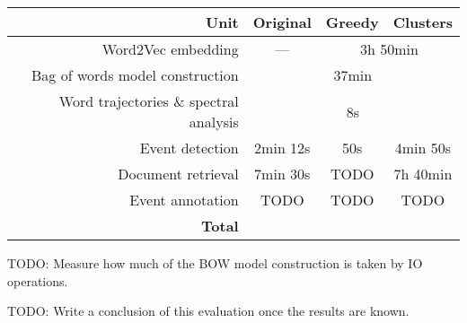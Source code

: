 \hspace{\fill}

\begin{minipage}{\linewidth}
\centering
\begin{tabular}{ r c c c }\toprule[1.5pt]
\bf Unit & \bf Original & \bf Greedy & \bf Clusters \\ \midrule
Word2Vec embedding & --- & \multicolumn{2}{c}{3h 50min} \\
Bag of words model construction & \multicolumn{3}{c}{37min} \\
Word trajectories \& spectral analysis & \multicolumn{3}{c}{8s} \\
Event detection & 2min 12s & 50s & 4min 50s \\
Document retrieval & 7min 30s & {\color{red} TODO} & 7h 40min \\
Event annotation & {\color{red} TODO} & {\color{red} TODO} & {\color{red} TODO} \\ \midrule
\bf Total & & & \\ \bottomrule[1.25pt]

\end{tabular}\par
{} \label{tab:title}
\end{minipage}

\hspace{\fill}

{\color{red} TODO: Measure how much of the BOW model construction is taken by IO operations.}

{\color{red} TODO: Write a conclusion of this evaluation once the results are known.}

